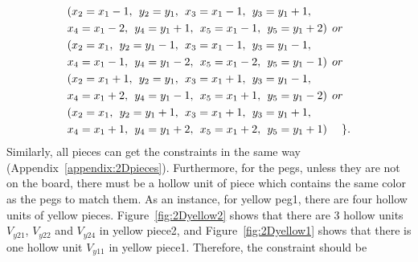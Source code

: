 \begin{equation}
\begin{aligned}
&(x_{2} = x_{1}-1 ,\hspace{1ex}y_{2} = y_{1},\hspace{1ex}x_{3} = x_{1}-1,\hspace{1ex}y_{3} = y_{1}+1,
\\&x_{4} = x_{1}-2,\hspace{1ex}y_{4} = y_{1}+1,\hspace{1ex}x_{5} = x_{1}-1,\hspace{1ex}y_{5} = y_{1}+2)\hspace{1ex} or \\
&(x_{2} = x_{1} ,\hspace{1ex}y_{2} = y_{1}-1,\hspace{1ex}x_{3} = x_{1}-1,\hspace{1ex}y_{3} = y_{1}-1,
\\&x_{4} = x_{1}-1,\hspace{1ex}y_{4} = y_{1}-2,\hspace{1ex}x_{5} = x_{1}-2,\hspace{1ex}y_{5} = y_{1}-1)\hspace{1ex} or \\
&(x_{2} = x_{1}+1 ,\hspace{1ex}y_{2} = y_{1},\hspace{1ex}x_{3} = x_{1}+1,\hspace{1ex}y_{3} = y_{1}-1,
\\&x_{4} = x_{1}+2,\hspace{1ex}y_{4} = y_{1}-1,\hspace{1ex}x_{5} = x_{1}+1,\hspace{1ex}y_{5} = y_{1}-2)\hspace{1ex} or \\
&(x_{2} = x_{1} ,\hspace{1ex}y_{2} = y_{1}+1,\hspace{1ex}x_{3} = x_{1}+1,\hspace{1ex}y_{3} = y_{1}+1,
\\&x_{4} = x_{1}+1,\hspace{1ex}y_{4} = y_{1}+2,\hspace{1ex}x_{5} = x_{1}+2,\hspace{1ex}y_{5} = y_{1}+1)\hspace{3ex}\}.
\end{aligned}
\end{equation}
Similarly, all pieces can get the constraints in the same way (Appendix~\ref{appendix:2Dpieces}). Furthermore, for the pegs, unless they are not on the board, there must be a hollow unit of piece which contains the same color as the pegs to match them. As an instance, for yellow peg1, there are four hollow units of yellow pieces. Figure~\ref{fig:2Dyellow2} shows that there are 3 hollow units $V_{y21}$, $V_{y22}$ and $V_{y24}$ in yellow piece2, and Figure~\ref{fig:2Dyellow1} shows that there is one hollow unit $V_{y11}$ in yellow piece1. Therefore, the constraint should be 
